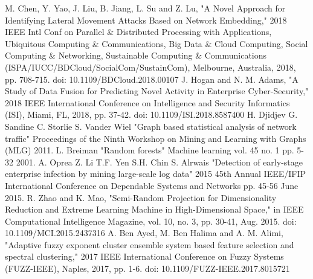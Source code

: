 \documentclass[12pt,journal,draftcls,doublespace, letterpaper,onecolumn]{IEEEtran}
\begin{document}
\begin{thebibliography}{99}  
	M. Chen, Y. Yao, J. Liu, B. Jiang, L. Su and Z. Lu, "A Novel Approach for Identifying Lateral Movement Attacks Based on Network Embedding," 2018 IEEE Intl Conf on Parallel \& Distributed Processing with Applications, Ubiquitous Computing \& Communications, Big Data \& Cloud Computing, Social Computing \& Networking, Sustainable Computing \& Communications (ISPA/IUCC/BDCloud/SocialCom/SustainCom), Melbourne, Australia, 2018, pp. 708-715.
	doi: 10.1109/BDCloud.2018.00107  
	J. Hogan and N. M. Adams, "A Study of Data Fusion for Predicting Novel Activity in Enterprise Cyber-Security," 2018 IEEE International Conference on Intelligence and Security Informatics (ISI), Miami, FL, 2018, pp. 37-42.
	doi: 10.1109/ISI.2018.8587400  
	H. Djidjev G. Sandine C. Storlie S. Vander Wiel "Graph based statistical analysis of network traffic" Proceedings of the Ninth Workshop on Mining and Learning with Graphs (MLG) 2011. 
	L. Breiman "Random forests" Machine learning vol. 45 no. 1 pp. 5-32 2001.
	A. Oprea Z. Li T.F. Yen S.H. Chin S. Alrwais "Detection of early-stage enterprise infection by mining large-scale log data" 2015 45th Annual IEEE/IFIP International Conference on Dependable Systems and Networks pp. 45-56 June 2015.
	R. Zhao and K. Mao, "Semi-Random Projection for Dimensionality Reduction and Extreme Learning Machine in High-Dimensional Space," in IEEE Computational Intelligence Magazine, vol. 10, no. 3, pp. 30-41, Aug. 2015.
	doi: 10.1109/MCI.2015.2437316
	A. Ben Ayed, M. Ben Halima and A. M. Alimi, "Adaptive fuzzy exponent cluster ensemble system based feature selection and spectral clustering," 2017 IEEE International Conference on Fuzzy Systems (FUZZ-IEEE), Naples, 2017, pp. 1-6.
	doi: 10.1109/FUZZ-IEEE.2017.8015721

	
\end{thebibliography}
\end{document}
